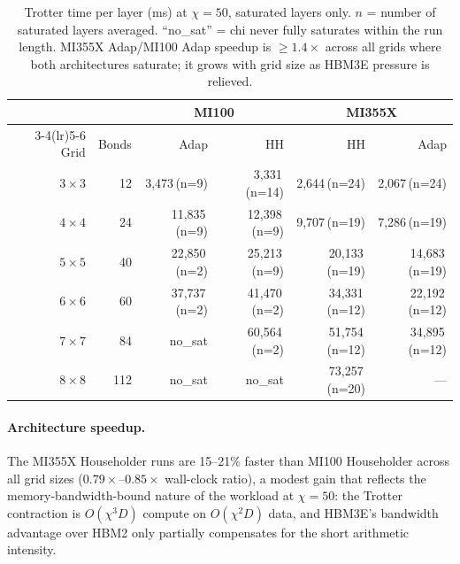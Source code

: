 \begin{table}[ht]
\centering
\caption{Trotter time per layer (ms) at $\chi=50$, saturated layers only.
  $n$ = number of saturated layers averaged.
  ``no\_sat'' = chi never fully saturates within the run length.
  MI355X Adap/MI100 Adap speedup is $\geq 1.4\times$ across all grids where both
  architectures saturate; it grows with grid size as HBM3E pressure is relieved.}
\label{tab:grid_scaling_mi355x}
\smallskip
\small
\begin{tabular}{r r rr rr}
\toprule
& & \multicolumn{2}{c}{MI100} & \multicolumn{2}{c}{MI355X} \\
\cmidrule(lr){3-4}\cmidrule(lr){5-6}
Grid & Bonds & Adap & HH & HH & Adap \\
\midrule
$3\times3$  & 12  & 3{,}473\,(n=9)  & 3{,}331\,(n=14) & 2{,}644\,(n=24) & 2{,}067\,(n=24) \\
$4\times4$  & 24  & 11{,}835\,(n=9) & 12{,}398\,(n=9) & 9{,}707\,(n=19) & 7{,}286\,(n=19) \\
$5\times5$  & 40  & 22{,}850\,(n=2) & 25{,}213\,(n=9) & 20{,}133\,(n=19)& 14{,}683\,(n=19)\\
$6\times6$  & 60  & 37{,}737\,(n=2) & 41{,}470\,(n=2) & 34{,}331\,(n=12)& 22{,}192\,(n=12)\\
$7\times7$  & 84  & no\_sat         & 60{,}564\,(n=2) & 51{,}754\,(n=12)& 34{,}895\,(n=12)\\
$8\times8$  & 112 & no\_sat         & no\_sat         & 73{,}257\,(n=20)& ---            \\
\bottomrule
\end{tabular}
\end{table}

\paragraph{Architecture speedup.}
The MI355X Householder runs are 15--21\% faster than MI100 Householder across all
grid sizes ($0.79\times$--$0.85\times$ wall-clock ratio), a modest gain that
reflects the memory-bandwidth-bound nature of the workload at $\chi=50$: the
Trotter contraction is $O(\chi^3 D)$ compute on $O(\chi^2 D)$ data, and HBM3E's
bandwidth advantage over HBM2 only partially compensates for the short arithmetic
intensity.

